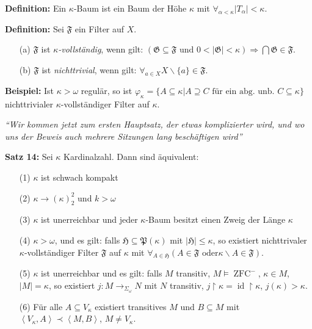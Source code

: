 \documentclass[a4paper,fontsize=11pt]{scrartcl}
\newcommand{\ZFC}{\operatorname{ZFC}}
\newcommand{\id}{\operatorname{id}}
\begin{document}
{\bf Definition:} Ein $\kappa$-Baum ist ein Baum der Höhe $\kappa$ mit
$\forall_{\alpha<\kappa} |T_\alpha|<\kappa$.

{\bf Definition:} Sei $\mathfrak{F}$ ein Filter auf $X$.
\begin{itemize}
  \item[(a)] $\mathfrak{F}$ ist {\it $\kappa$-vollständig}, wenn gilt:
    $(\mathfrak{G}\subseteq\mathfrak{F}\mbox{ und }
    0<|\mathfrak{G}|<\kappa)\Rightarrow\bigcap\mathfrak{G}\in\mathfrak{F}$.
  \item[(b)] $\mathfrak{F}$ ist {\it nichttrivial}, wenn gilt:
    $\forall_{a\in X} X\backslash\{a\}\in\mathfrak{F}$.
\end{itemize}

{\bf Beispiel:} Ist $\kappa>\omega$ regulär, so ist
$\varphi_\kappa=\{A\subseteq\kappa|A\supseteq C\mbox{ für ein
  abg. unb. }C\subseteq\kappa\}$ nichttrivialer $\kappa$-vollständiger
Filter auf $\kappa$.

{\it ``Wir kommen jetzt zum ersten Hauptsatz, der etwas komplizierter
  wird, und wo uns der Beweis auch mehrere Sitzungen lang beschäftigen
  wird''}

{\bf Satz 14:} Sei $\kappa$ Kardinalzahl. Dann sind äquivalent:
\begin{itemize}
\item[(1)] $\kappa$ ist schwach kompakt
\item[(2)] $\kappa\rightarrow(\kappa)_2^2$ und $k>\omega$
\item[(3)] $\kappa$ ist unerreichbar und jeder $\kappa$-Baum besitzt
  einen Zweig der Länge $\kappa$
\item[(4)] $\kappa>\omega$, und es gilt: falls
  $\mathfrak{H}\subseteq\mathfrak{P}(\kappa)$ mit
  $|\mathfrak{H}|\le\kappa$, so existiert nichttrivaler
  $\kappa$-vollständiger Filter $\mathfrak{F}$ auf $\kappa$ mit
  $\forall_{A\in\mathfrak{H}}(A\in\mathfrak{F}\mbox{ oder
}\kappa\backslash A\in\mathfrak{F})$.
\item[(5)] $\kappa$ ist unerreichbar und es gilt: falls $M$ transitiv,
  $M\models\ZFC^-$, $\kappa\in M$, $|M|=\kappa$, so existiert
  $j:M\rightarrow_{\Sigma_\omega} N$ mit $N$ transitiv,
  $j\upharpoonright\kappa=\id\upharpoonright\kappa$,
  $j(\kappa)>\kappa$.
\item[(6)] Für alle $A\subseteq V_\kappa$ existiert transitives $M$
  und $B\subseteq M$ mit
  $\left<V_\kappa,A\right>\prec\left<M,B\right>$, $M\neq V_\kappa$.
\end{itemize}
\end{document}
